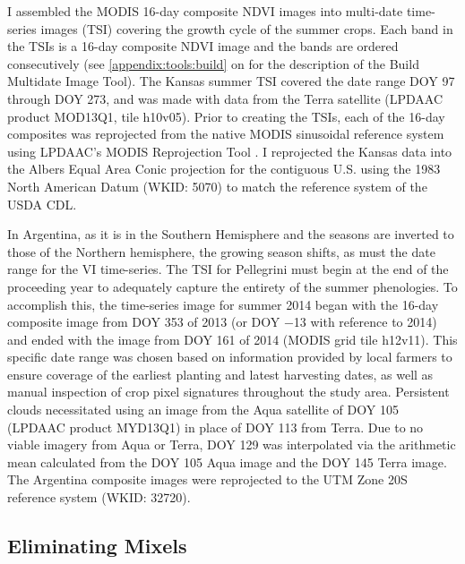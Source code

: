 I assembled the MODIS 16-day composite NDVI images into multi-date time-series images (TSI) covering the growth cycle of the summer crops. Each band in the TSIs is a 16-day composite NDVI image and the bands are ordered consecutively (see \autoref{appendix:tools:build} on  for the description of the Build Multidate Image Tool). The Kansas summer TSI covered the date range DOY 97 through DOY 273, and was made with data from the Terra satellite (LPDAAC product MOD13Q1, tile h10v05). Prior to creating the TSIs, each of the 16-day composites was reprojected from the native MODIS sinusoidal reference system using LPDAAC's MODIS Reprojection Tool \autocite{modis4.1}. I reprojected the Kansas data into the Albers Equal Area Conic projection for the contiguous U.S. using the 1983 North American Datum (WKID: 5070) to match the reference system of the USDA CDL.

In Argentina, as it is in the Southern Hemisphere and the seasons are inverted to those of the Northern hemisphere, the growing season shifts, as must the date range for the VI time-series. The TSI for Pellegrini must begin at the end of the proceeding year to adequately capture the entirety of the summer phenologies. To accomplish this, the time-series image for summer 2014 began with the 16-day composite image from DOY 353 of 2013 (or DOY −13 with reference to 2014) and ended with the image from DOY 161 of 2014 (MODIS grid tile h12v11). This specific date range was chosen based on information provided by local farmers to ensure coverage of the earliest planting and latest harvesting dates, as well as manual inspection of crop pixel signatures throughout the study area. Persistent clouds necessitated using an image from the Aqua satellite of DOY 105 (LPDAAC product MYD13Q1) in place of DOY 113 from Terra. Due to no viable imagery from Aqua or Terra, DOY 129 was interpolated via the arithmetic mean calculated from the DOY 105 Aqua image and the DOY 145 Terra image. The Argentina composite images were reprojected to the UTM Zone 20S reference system (WKID: 32720).

\subsection{Eliminating Mixels}
\label{methods:mixels}

